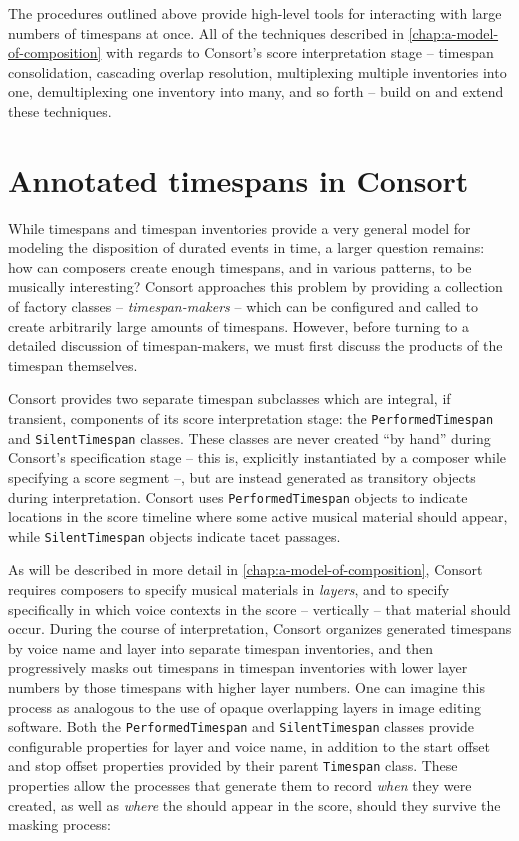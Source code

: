 The procedures outlined above provide high-level tools for interacting with
large numbers of timespans at once. All of the techniques described in
\autoref{chap:a-model-of-composition} with regards to Consort's score
interpretation stage -- timespan consolidation, cascading overlap
resolution, multiplexing multiple inventories into one, demultiplexing one
inventory into many, and so forth -- build on and extend these techniques.

\section{Annotated timespans in Consort}
\label{sec:annotated-timespans-in-consort}

While timespans and timespan inventories provide a very general model for
modeling the disposition of durated events in time, a larger question remains:
how can composers create enough timespans, and in various patterns, to be
musically interesting? Consort approaches this problem by providing a
collection of factory classes -- \emph{timespan-makers} -- which can be
configured and called to create arbitrarily large amounts of timespans.
However, before turning to a detailed discussion of timespan-makers, we must
first discuss the products of the timespan themselves.

Consort provides two separate timespan subclasses which are integral, if
transient, components of its score interpretation stage: the
\texttt{PerformedTimespan} and \texttt{SilentTimespan} classes. These classes
are never created \enquote{by hand} during Consort's specification stage --
this is, explicitly instantiated by a composer while specifying a score segment
--, but are instead generated as transitory objects during interpretation.
Consort uses \texttt{PerformedTimespan} objects to indicate locations in the
score timeline where some active musical material should appear, while
\texttt{SilentTimespan} objects indicate tacet passages.

As will be described in more detail in \autoref{chap:a-model-of-composition},
Consort requires composers to specify musical materials in \emph{layers}, and
to specify specifically in which voice contexts in the score -- vertically --
that material should occur. During the course of interpretation, Consort
organizes generated timespans by voice name and layer into separate timespan
inventories, and then progressively masks out timespans in timespan inventories
with lower layer numbers by those timespans with higher layer numbers. One can
imagine this process as analogous to the use of opaque overlapping layers in
image editing software. Both the \texttt{PerformedTimespan} and
\texttt{SilentTimespan} classes provide configurable properties for layer and
voice name, in addition to the start offset and stop offset properties provided
by their parent \texttt{Timespan} class. These properties allow the processes
that generate them to record \emph{when} they were created, as well as
\emph{where} the should appear in the score, should they survive the masking
process:

